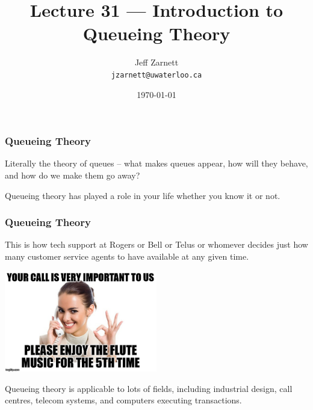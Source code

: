 

\title{Lecture 31 --- Introduction to Queueing Theory}

\author{Jeff Zarnett\\ \small \texttt{jzarnett@uwaterloo.ca}}
\date{\today}




\begin{frame}
  \titlepage

 \end{frame}



\begin{frame}
\frametitle{Queueing Theory}

Literally the theory of queues -- what makes queues appear, how will they behave, and how do we make them go away? 


Queueing theory has played a role in your life whether you know it or not. 



\end{frame}

\begin{frame}
\frametitle{Queueing Theory}

This is how tech support at Rogers or Bell or Telus or whomever decides just how many customer service agents to have available at any given time. 

\begin{center}
	\includegraphics[width=0.5\textwidth]{images/techsupport.jpg}
\end{center}

Queueing theory is applicable to lots of fields, including industrial design, call centres, telecom systems, and computers executing transactions. 

\end{frame}



